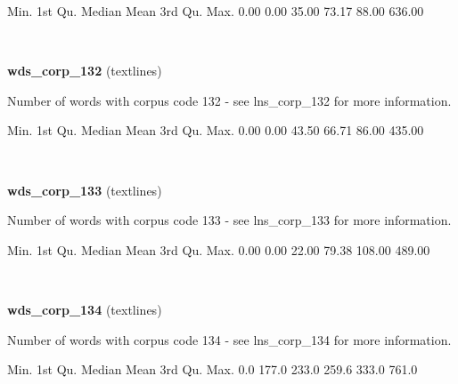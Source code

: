 \documentclass[]{article}
\newenvironment{Shaded}{\begin{snugshade}}{\end{snugshade}}
\newcommand{\FloatTok}[1]{\textcolor[rgb]{0.00,0.00,0.81}{{#1}}}
\newcommand{\NormalTok}[1]{{#1}}
\begin{document}
\begin{Shaded}
\begin{Highlighting}[]
   \NormalTok{Min. 1st Qu.  Median    Mean 3rd Qu.    Max. }
   \FloatTok{0.00}    \FloatTok{0.00}   \FloatTok{35.00}   \FloatTok{73.17}   \FloatTok{88.00}  \FloatTok{636.00} 
\end{Highlighting}
\end{Shaded}

~

\vspace{1em}

\textbf{wds\_corp\_132} (textlines)

Number of words with corpus code 132 - see lns\_corp\_132 for more
information.

\begin{Shaded}
\begin{Highlighting}[]
   \NormalTok{Min. 1st Qu.  Median    Mean 3rd Qu.    Max. }
   \FloatTok{0.00}    \FloatTok{0.00}   \FloatTok{43.50}   \FloatTok{66.71}   \FloatTok{86.00}  \FloatTok{435.00} 
\end{Highlighting}
\end{Shaded}

~

\vspace{1em}

\textbf{wds\_corp\_133} (textlines)

Number of words with corpus code 133 - see lns\_corp\_133 for more
information.

\begin{Shaded}
\begin{Highlighting}[]
   \NormalTok{Min. 1st Qu.  Median    Mean 3rd Qu.    Max. }
   \FloatTok{0.00}    \FloatTok{0.00}   \FloatTok{22.00}   \FloatTok{79.38}  \FloatTok{108.00}  \FloatTok{489.00} 
\end{Highlighting}
\end{Shaded}

~

\vspace{1em}

\textbf{wds\_corp\_134} (textlines)

Number of words with corpus code 134 - see lns\_corp\_134 for more
information.

\begin{Shaded}
\begin{Highlighting}[]
   \NormalTok{Min. 1st Qu.  Median    Mean 3rd Qu.    Max. }
    \FloatTok{0.0}   \FloatTok{177.0}   \FloatTok{233.0}   \FloatTok{259.6}   \FloatTok{333.0}   \FloatTok{761.0} 
\end{Highlighting}
\end{Shaded}
\end{document}
